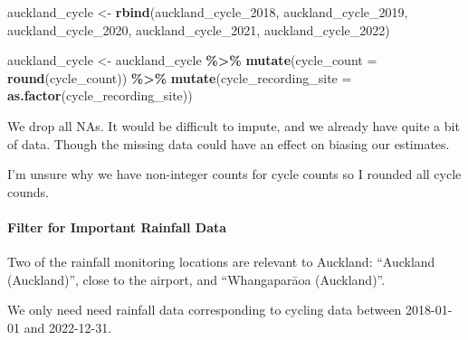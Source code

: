 \documentclass[
]{article}
\newenvironment{Shaded}{\begin{snugshade}}{\end{snugshade}}
\newcommand{\AttributeTok}[1]{\textcolor[rgb]{0.13,0.29,0.53}{#1}}
\newcommand{\FunctionTok}[1]{\textcolor[rgb]{0.13,0.29,0.53}{\textbf{#1}}}
\newcommand{\NormalTok}[1]{#1}
\newcommand{\OtherTok}[1]{\textcolor[rgb]{0.56,0.35,0.01}{#1}}
\newcommand{\SpecialCharTok}[1]{\textcolor[rgb]{0.81,0.36,0.00}{\textbf{#1}}}
\begin{document}
\begin{Shaded}
\begin{Highlighting}[]
\NormalTok{auckland\_cycle }\OtherTok{\textless{}{-}} \FunctionTok{rbind}\NormalTok{(auckland\_cycle\_2018, auckland\_cycle\_2019, auckland\_cycle\_2020, auckland\_cycle\_2021, auckland\_cycle\_2022)}

\NormalTok{auckland\_cycle }\OtherTok{\textless{}{-}}\NormalTok{ auckland\_cycle }\SpecialCharTok{\%\textgreater{}\%}
  \FunctionTok{mutate}\NormalTok{(}\AttributeTok{cycle\_count =} \FunctionTok{round}\NormalTok{(cycle\_count)) }\SpecialCharTok{\%\textgreater{}\%}
  \FunctionTok{mutate}\NormalTok{(}\AttributeTok{cycle\_recording\_site =} \FunctionTok{as.factor}\NormalTok{(cycle\_recording\_site))}
\end{Highlighting}
\end{Shaded}

We drop all NAs. It would be difficult to impute, and we already have
quite a bit of data. Though the missing data could have an effect on
biasing our estimates.

I'm unsure why we have non-integer counts for cycle counts so I rounded
all cycle counds.

\hypertarget{filter-for-important-rainfall-data}{%
\paragraph{Filter for Important Rainfall
Data}\label{filter-for-important-rainfall-data}}

Two of the rainfall monitoring locations are relevant to Auckland:
``Auckland (Auckland)'', close to the airport, and ``Whangaparāoa
(Auckland)''.

We only need need rainfall data corresponding to cycling data between
2018-01-01 and 2022-12-31.
\end{document}
